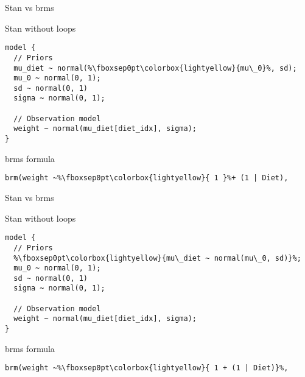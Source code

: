 \documentclass[finnish,english,t]{beamer}
\begin{document}
\begin{frame}[fragile]{Stan vs brms}

  \vspace{-0.5\baselineskip}

  Stan without loops
  
{\small
\begin{verbatim}
model {
  // Priors
  mu_diet ~ normal(%\fboxsep0pt\colorbox{lightyellow}{mu\_0}%, sd);
  mu_0 ~ normal(0, 1);
  sd ~ normal(0, 1)
  sigma ~ normal(0, 1);
  
  // Observation model
  weight ~ normal(mu_diet[diet_idx], sigma);
}
\end{verbatim}

  brms formula
\begin{verbatim}  
brm(weight ~%\fboxsep0pt\colorbox{lightyellow}{ 1 }%+ (1 | Diet),
\end{verbatim}
}

\end{frame}

\begin{frame}[fragile]{Stan vs brms}

  \vspace{-0.5\baselineskip}

  Stan without loops
  
{\small
\begin{verbatim}
model {
  // Priors
  %\fboxsep0pt\colorbox{lightyellow}{mu\_diet ~ normal(mu\_0, sd)}%;
  mu_0 ~ normal(0, 1);
  sd ~ normal(0, 1)
  sigma ~ normal(0, 1);
  
  // Observation model
  weight ~ normal(mu_diet[diet_idx], sigma);
}
\end{verbatim}

  brms formula
\begin{verbatim}  
brm(weight ~%\fboxsep0pt\colorbox{lightyellow}{ 1 + (1 | Diet)}%,
\end{verbatim}
}

\end{frame}
\end{document}
